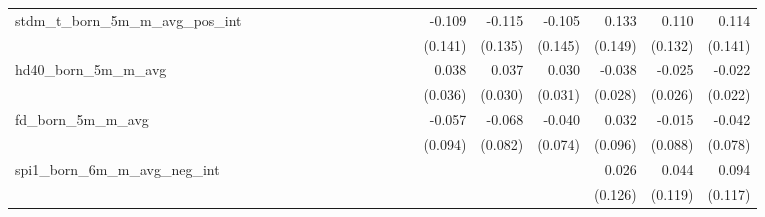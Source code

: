 \begin{tabular}{lrrrrrrrrrrrrrrrrrr}
stdm\_t\_born\_5m\_m\_avg\_pos\_int         &             &             &             &             &             &             &             &             &             &             &             &             &      -0.109 &      -0.115 &      -0.105 &       0.133 &       0.110 &       0.114 \\ 
                                            &             &             &             &             &             &             &             &             &             &             &             &             &     (0.141) &     (0.135) &     (0.145) &     (0.149) &     (0.132) &     (0.141) \\ 
hd40\_born\_5m\_m\_avg                      &             &             &             &             &             &             &             &             &             &             &             &             &       0.038 &       0.037 &       0.030 &      -0.038 &      -0.025 &      -0.022 \\ 
                                            &             &             &             &             &             &             &             &             &             &             &             &             &     (0.036) &     (0.030) &     (0.031) &     (0.028) &     (0.026) &     (0.022) \\ 
fd\_born\_5m\_m\_avg                        &             &             &             &             &             &             &             &             &             &             &             &             &      -0.057 &      -0.068 &      -0.040 &       0.032 &      -0.015 &      -0.042 \\ 
                                            &             &             &             &             &             &             &             &             &             &             &             &             &     (0.094) &     (0.082) &     (0.074) &     (0.096) &     (0.088) &     (0.078) \\ 
spi1\_born\_6m\_m\_avg\_neg\_int            &             &             &             &             &             &             &             &             &             &             &             &             &             &             &             &       0.026 &       0.044 &       0.094 \\ 
                                            &             &             &             &             &             &             &             &             &             &             &             &             &             &             &             &     (0.126) &     (0.119) &     (0.117) \\ 

\end{tabular}
